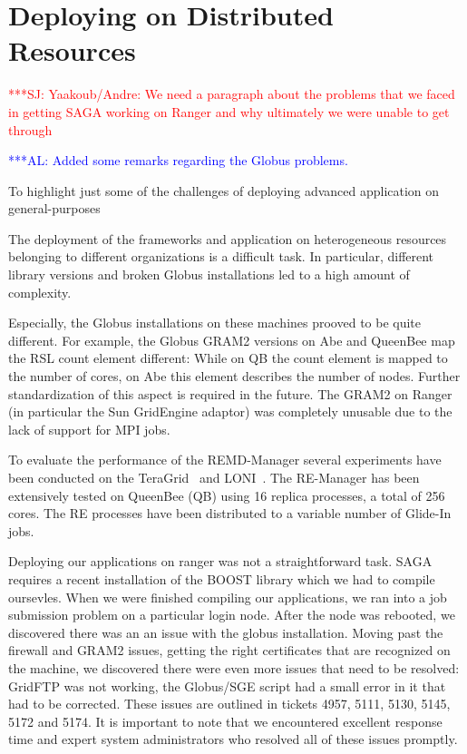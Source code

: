 \documentclass[conference,final]{IEEEtran}
\newcommand{\alnote}[1]{ {\textcolor{blue} { ***AL: #1 }}}
\newcommand{\jhanote}[1]{ {\textcolor{red} { ***SJ: #1 }}}
\newcommand{\alnote}[1]{}
\newcommand{\jhanote}[1]{}
\begin{document}
\section{Deploying on Distributed Resources}

\jhanote{Yaakoub/Andre: We need a paragraph about the problems that we
  faced in getting SAGA working on Ranger and why ultimately we were
  unable to get through}

\alnote{Added some remarks regarding the Globus problems.}

To highlight just some of the challenges of deploying advanced
application on general-purposes 

The deployment of the frameworks and application on heterogeneous
resources belonging to different organizations is a difficult task. In
particular, different library versions and broken Globus installations
led to a high amount of complexity.

Especially, the Globus installations on these machines prooved to be
quite different.  For example, the Globus GRAM2 versions on Abe and
QueenBee map the RSL count element different: While on QB the count
element is mapped to the number of cores, on Abe this element
describes the number of nodes. Further standardization of this aspect
is required in the future. The GRAM2 on Ranger (in particular the Sun
GridEngine adaptor) was completely unusable due to the lack of support
for MPI jobs.

To evaluate the performance of the REMD-Manager several experiments
have been conducted on the TeraGrid~\cite{teragrid} and
LONI~\cite{loni}. The RE-Manager has been extensively tested on
QueenBee (QB) using 16 replica processes, a total of 256 cores.  The
RE processes have been distributed to a variable number of Glide-In
jobs.

Deploying our applications on ranger was not a straightforward task.
SAGA requires a recent installation of the BOOST library which we had
to compile oursevles. When we were finished compiling our
applications, we ran into a job submission problem on a particular
login node. After the node was rebooted, we discovered there was an an
issue with the globus installation. Moving past the firewall and GRAM2
issues, getting the right certificates that are recognized on the
machine, we discovered there were even more issues that need to be
resolved: GridFTP was not working, the Globus/SGE script had a small
error in it that had to be corrected. These issues are outlined in
tickets 4957, 5111, 5130, 5145, 5172 and 5174. It is important to note
that we encountered excellent response time and expert system
administrators who resolved all of these issues promptly.
\end{document}
